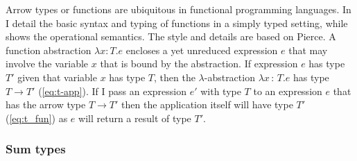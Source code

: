 \documentclass[12pt,twoside,notitlepage]{report}
\theoremstyle{plain}%
\theoremstyle{definition}
\theoremstyle{remark}
\begin{document}
Arrow types or functions are ubiquitous in functional programming languages. In  I detail the basic syntax and typing of functions in a simply typed setting, while  shows the operational semantics. The style and details are based on Pierce\cite[p.~103]{pierce2002types}. A function abstraction $ \lambda x:T. e $ encloses a yet unreduced expression $ e $ that may involve the variable $ x $ that is bound by the abstraction. If expression $ e $ has type $ T' $ given that variable $ x $ has type $ T $, then the $ \lambda $-abstraction $ \lambda x\,:\,T.e $ has type $ T\rightarrow T' $ (\ref{eq:t-app}). If I pass an expression $ e' $ with type $ T $ to an expression $ e $ that has the arrow type $ T \rightarrow T' $ then the application itself will have type $ T' $ (\ref{eq:t_fun}) as $ e $ will return a result of type $ T' $.  


\subsubsection{Sum types}
\end{document}
